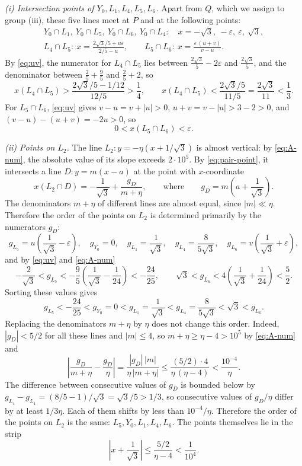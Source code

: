 \emph{(i) Intersection points of $Y_0,L_1,L_4,L_5,L_6$.} Apart from $Q$, which we assign to group (iii), these five lines meet at $P$ and at the following points:
\[
\begin{gathered}
Y_0\cap L_1,\ Y_0\cap L_5,\ Y_0\cap L_6,\ Y_0\cap L_4:\quad
x=-\sqrt3,\ -\varepsilon,\ \varepsilon,\ \sqrt3,\\
L_4\cap L_5:\ x=\frac{2\sqrt3/5+u\varepsilon}{2/5-u},
\qquad
L_5\cap L_6:\ x=\frac{\varepsilon\,(u+v)}{v-u} .
\end{gathered}
\]
By \eqref{eq:uv}, the numerator for $L_4\cap L_5$ lies between $\tfrac{2\sqrt3}5-2\varepsilon$ and $\tfrac{2\sqrt3}5$, and the denominator between $\tfrac25+\tfrac95$ and $\tfrac25+2$, so
\[
x(L_4\cap L_5)>\frac{2\sqrt3/5-1/12}{12/5}>\frac14,
\qquad
x(L_4\cap L_5)<\frac{2\sqrt3/5}{11/5}=\frac{2\sqrt3}{11}<\frac13 .
\]
For $L_5\cap L_6$, \eqref{eq:uv} gives $v-u=v+|u|>0$, $u+v=v-|u|>3-2>0$, and
$(v-u)-(u+v)=-2u>0$, so
\[
0<x(L_5\cap L_6)<\varepsilon .
\]

\emph{(ii) Points on $L_2$.} The line $L_2:y=-\eta(x+1/\sqrt3)$ is almost vertical: by \eqref{eq:A-num}, the absolute value of its slope exceeds $2\cdot10^5$.
By \eqref{eq:pair-point}, it intersects a line $D:y=m(x-a)$ at the point with $x$-coordinate
\[
x(L_2\cap D)=-\frac1{\sqrt3}+\frac{g_D}{m+\eta},
\qquad\text{where}\qquad
g_D=m\left(a+\frac1{\sqrt3}\right).
\]
The denominators $m+\eta$ of different lines are almost equal, since $|m|\ll\eta$. Therefore the order of the points on $L_2$ is determined primarily by the numerators $g_D$:
\[
g_{L_5}=u\left(\frac1{\sqrt3}-\varepsilon\right),
\quad
g_{Y_0}=0,
\quad
g_{L_1}=\frac1{\sqrt3},
\quad
g_{L_4}=\frac8{5\sqrt3},
\quad
g_{L_6}=v\left(\frac1{\sqrt3}+\varepsilon\right),
\]
and by \eqref{eq:uv} and \eqref{eq:A-num}
\[
-\frac2{\sqrt3}<g_{L_5}<-\frac95\left(\frac1{\sqrt3}-\frac1{24}\right)<-\frac{24}{25},
\qquad
\sqrt3<g_{L_6}<4\left(\frac1{\sqrt3}+\frac1{24}\right)<\frac52 .
\]
Sorting these values gives
\[
g_{L_5}<-\frac{24}{25}<g_{Y_0}=0<g_{L_1}=\frac1{\sqrt3}
<g_{L_4}=\frac8{5\sqrt3}<\sqrt3<g_{L_6}.
\]
Replacing the denominators $m+\eta$ by $\eta$ does not change this order.
Indeed, $|g_D|<5/2$ for all these lines and $|m|\le4$, so $m+\eta\ge\eta-4>10^5$ by \eqref{eq:A-num} and
\[
\left|\frac{g_D}{m+\eta}-\frac{g_D}{\eta}\right|
=\frac{|g_D|\,|m|}{\eta\,|m+\eta|}
\le\frac{(5/2)\cdot4}{\eta\,(\eta-4)}
<\frac{10^{-4}}\eta .
\]
The difference between consecutive values of $g_D$ is bounded below by $g_{L_4}-g_{L_1}=(8/5-1)/\sqrt3=\sqrt3/5>1/3$, so consecutive values of $g_D/\eta$ differ by at least $1/3\eta$.
Each of them shifts by less than $10^{-4}/\eta$.
Therefore the order of the points on $L_2$ is the same: $L_5,Y_0,L_1,L_4,L_6$. The points themselves lie in the strip
\[
\left|x+\frac1{\sqrt3}\right|\le\frac{5/2}{\eta-4}<\frac1{10^{4}}.
\]

